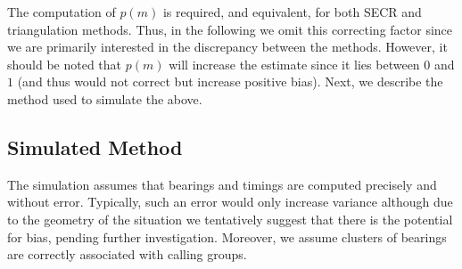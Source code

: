 \documentclass[10pt,a4paper,final]{article}
\begin{document}
The computation of $p(m)$ is required, and equivalent, for both SECR and triangulation methods. Thus, in the following we omit this correcting factor since we are primarily interested in the discrepancy between the methods. However, it should be noted that $p(m)$ will increase the estimate since it lies between $0$ and $1$ (and thus would not correct but increase positive bias). Next, we describe the method used to simulate the above.

\subsection{Simulated Method}

The simulation assumes that bearings and timings are computed precisely and without error. Typically, such an error would only increase variance although due to the geometry of the situation we tentatively suggest that there is the potential for bias, pending further investigation. Moreover, we assume clusters of bearings are correctly associated with calling groups.
\end{document}

